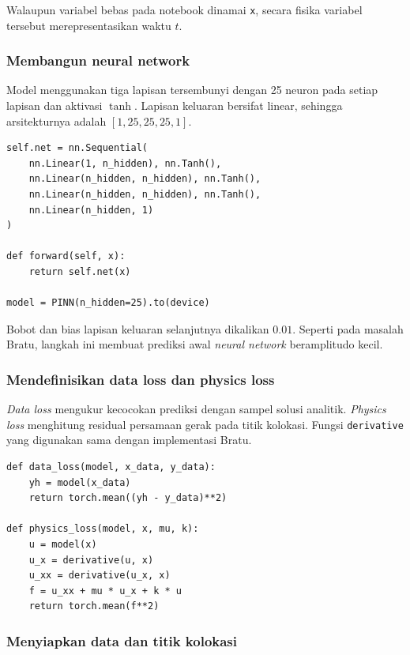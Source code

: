 \documentclass[12pt, letterpaper]{article}
\begin{document}
Walaupun variabel bebas pada notebook dinamai \texttt{x}, secara fisika
variabel tersebut merepresentasikan waktu $t$.

\subsubsection{Membangun neural network}

Model menggunakan tiga lapisan tersembunyi dengan 25 neuron pada setiap
lapisan dan aktivasi $\tanh$. Lapisan keluaran bersifat linear, sehingga
arsitekturnya adalah $[1,25,25,25,1]$.

\begin{lstlisting}[caption={Arsitektur neural network pada notebook osilator}]
self.net = nn.Sequential(
    nn.Linear(1, n_hidden), nn.Tanh(),
    nn.Linear(n_hidden, n_hidden), nn.Tanh(),
    nn.Linear(n_hidden, n_hidden), nn.Tanh(),
    nn.Linear(n_hidden, 1)
)

def forward(self, x):
    return self.net(x)

model = PINN(n_hidden=25).to(device)
\end{lstlisting}

Bobot dan bias lapisan keluaran selanjutnya dikalikan $0.01$. Seperti pada
masalah Bratu, langkah ini membuat prediksi awal \textit{neural network} beramplitudo kecil.

\subsubsection{Mendefinisikan data loss dan physics loss}

\textit{Data loss} mengukur kecocokan prediksi dengan sampel solusi analitik.
\textit{Physics loss} menghitung residual persamaan gerak pada titik kolokasi.
Fungsi \texttt{derivative} yang digunakan sama dengan implementasi Bratu.

\begin{lstlisting}[caption={Dua komponen loss pada osilator}]
def data_loss(model, x_data, y_data):
    yh = model(x_data)
    return torch.mean((yh - y_data)**2)

def physics_loss(model, x, mu, k):
    u = model(x)
    u_x = derivative(u, x)
    u_xx = derivative(u_x, x)
    f = u_xx + mu * u_x + k * u
    return torch.mean(f**2)
\end{lstlisting}

\subsubsection{Menyiapkan data dan titik kolokasi}
\end{document}
